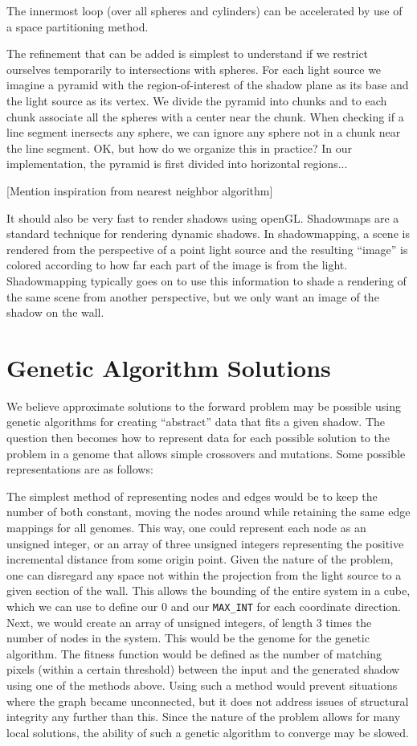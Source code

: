 \documentclass[letter,10pt]{article}
\begin{document}
The innermost loop (over all spheres and cylinders) can be accelerated by use of a space partitioning method.

The refinement that can be added is simplest to understand if we restrict ourselves temporarily to intersections with spheres. For each light source we imagine a pyramid with the region-of-interest of the shadow plane as its base and the light source as its vertex. We divide the pyramid into chunks and to each chunk associate all the spheres with a center near the chunk. When checking if a line segment inersects any sphere, we can ignore any sphere not in a chunk near the line segment. OK, but how do we organize this in practice? In our implementation, the pyramid is first divided into horizontal regions...

[Mention inspiration from nearest neighbor algorithm]


It should also be very fast to render shadows using openGL. Shadowmaps are a standard technique for rendering dynamic shadows. In shadowmapping, a scene is rendered from the perspective of a point light source and the resulting ``image'' is colored according to how far each part of the image is from the light. Shadowmapping typically goes on to use this information to shade a rendering of the same scene from another perspective, but we only want an image of the shadow on the wall.

\section{Genetic Algorithm Solutions}
We believe approximate solutions to the forward problem may be possible using genetic algorithms for creating ``abstract'' data that fits a given shadow.  The question then becomes how to represent data for each possible solution to the problem in a genome that allows simple crossovers and mutations.  Some possible representations are as follows: 

The simplest method of representing nodes and edges would be to keep the number of both constant, moving the nodes around while retaining the same edge mappings for all genomes.  This way, one could represent each node as an unsigned integer, or an array of three unsigned integers representing the positive incremental distance from some origin point.  Given the nature of the problem, one can disregard any space not within the projection from the light source to a given section of the wall.  This allows the bounding of the entire system in a cube, which we can use to define our 0 and our \texttt{MAX\_INT} for each coordinate direction.  Next, we would create an array of unsigned integers, of length 3 times the number of nodes in the system.  This would be the genome for the genetic algorithm.  The fitness function would be defined as the number of matching pixels (within a certain threshold) between the input and the generated shadow using one of the methods above.  Using such a method would prevent situations where the graph became unconnected, but it does not address issues of structural integrity any further than this.  Since the nature of the problem allows for many local solutions, the ability of such a genetic algorithm to converge may be slowed.
\end{document}
